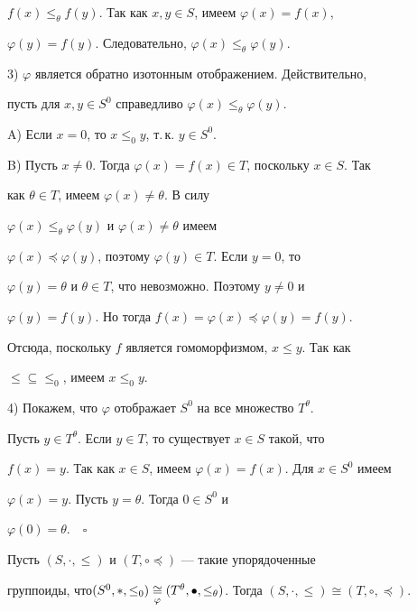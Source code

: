 $f(x)\le_\theta f(y)$. Так как $x,y\in S$, имеем $\varphi(x)=f(x)$, 


$\varphi(y)=f(y)$. Следовательно, $\varphi(x)\le_\theta \varphi(y)$. 


 


3) $\varphi$ является обратно изотонным отображением. Действительно, 


пусть для $x,y\in S^0$ справедливо $\varphi(x)\le_\theta \varphi(y)$. 


 


A) Если $x=0$, то $x\le_0 y$, т.\,к. $y\in S^0$. 


 


B) Пусть $x\ne0$. Тогда $\varphi(x)=f(x)\in T$, поскольку $x\in S$. Так 


как $\theta\in T$, имеем $\varphi(x)\ne\theta$. В силу 


$\varphi(x)\le_\theta \varphi(y)$ и $\varphi(x)\ne\theta$ имеем 


$\varphi(x)\preceq \varphi(y)$, поэтому $\varphi(y)\in T$. Если $y=0$, то 


$\varphi(y)=\theta$ и $\theta\in T$, что невозможно. Поэтому $y\ne0$ и 


$\varphi(y)=f(y)$. Но тогда $f(x)=\varphi(x)\preceq \varphi(y)=f(y)$. 


Отсюда, поскольку $f$ является гомоморфизмом, $x\le y$. Так как 


$\le\subseteq\le_0$, имеем $x\le_0 y$. 


 


4) Покажем, что $\varphi$ отображает $S^0$ на все множество $T^\theta$. 


Пусть $y\in T^\theta$. Если $y\in T$, то существует $x\in S$ такой, что 


$f(x)=y$. Так как $x\in S$, имеем $\varphi(x)=f(x)$. Для $x\in S^0$ имеем 


$\varphi(x)=y$. Пусть $y=\theta$. Тогда $0\in S^0$ и


$\varphi(0)=\theta$.$\quad\square$


 


\begin{prop} 


Пусть $(S,\cdot,\le)$ и $(T,\circ\preceq)$ --- такие упорядоченные 


группоиды, что\linebreak $(S^0,*,\le_0) \down{\varphi}{\cong} 


(T^\theta,\bullet,\le_\theta)$. Тогда $(S,\cdot,\le)\cong 


(T,\circ,\preceq)$. 


\end{prop} 


